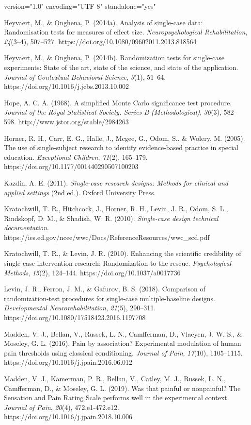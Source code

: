 version="1.0" encoding="UTF-8" standalone="yes" \documentclass{article}
\begin{document}
Heyvaert, M., \& Onghena, P. (2014a). Analysis of single-case data: Randomisation tests for measures of effect size. \emph{Neuropsychological Rehabilitation}, \emph{24}(3--4), 507--527. https://doi.org/10.1080/09602011.2013.818564

Heyvaert, M., \& Onghena, P. (2014b). Randomization tests for single-case experiments: State of the art, state of the science, and state of the application. \emph{Journal of Contextual Behavioral Science}, \emph{3}(1), 51--64. https://doi.org/10.1016/j.jcbs.2013.10.002

Hope, A. C. A. (1968). A simplified Monte Carlo significance test procedure. \emph{Journal of the Royal Statistical Society. Series B (Methodological)}, \emph{30}(3), 582--598. http://www.jstor.org/stable/2984263

Horner, R. H., Carr, E. G., Halle, J., Mcgee, G., Odom, S., \& Wolery, M. (2005). The use of single-subject research to identify evidence-based practice in special education. \emph{Exceptional Children}, \emph{71}(2), 165--179. https://doi.org/10.1177/001440290507100203

Kazdin, A. E. (2011). \emph{Single-case research designs: Methods for clinical and applied settings} (2nd ed.). Oxford University Press.

Kratochwill, T. R., Hitchcock, J., Horner, R. H., Levin, J. R., Odom, S. L., Rindskopf, D. M., \& Shadish, W. R. (2010). \emph{Single-case design technical documentation}. https://ies.ed.gov/ncee/wwc/Docs/ReferenceResources/wwc\_scd.pdf

Kratochwill, T. R., \& Levin, J. R. (2010). Enhancing the scientific credibility of single-case intervention research: Randomization to the rescue. \emph{Psychological Methods}, \emph{15}(2), 124--144. https://doi.org/10.1037/a0017736

Levin, J. R., Ferron, J. M., \& Gafurov, B. S. (2018). Comparison of randomization-test procedures for single-case multiple-baseline designs. \emph{Developmental Neurorehabilitation}, \emph{21}(5), 290--311. https://doi.org/10.1080/17518423.2016.1197708

Madden, V. J., Bellan, V., Russek, L. N., Camfferman, D., Vlaeyen, J. W. S., \& Moseley, G. L. (2016). Pain by association? Experimental modulation of human pain thresholds using classical conditioning. \emph{Journal of Pain}, \emph{17}(10), 1105--1115. https://doi.org/10.1016/j.jpain.2016.06.012

Madden, V. J., Kamerman, P. R., Bellan, V., Catley, M. J., Russek, L. N., Camfferman, D., \& Moseley, G. L. (2019). Was that painful or nonpainful? The Sensation and Pain Rating Scale performs well in the experimental context. \emph{Journal of Pain}, \emph{20}(4), 472.e1-472.e12. https://doi.org/10.1016/j.jpain.2018.10.006
\end{document}

